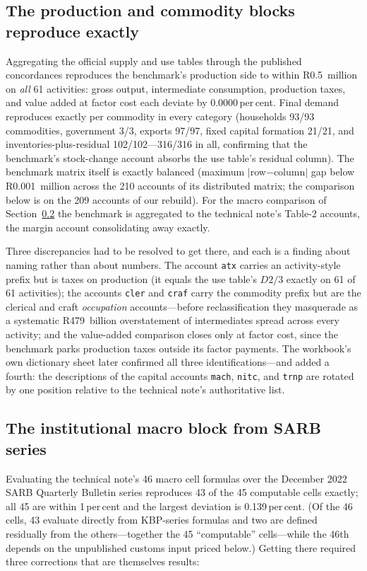 \subsection{The production and commodity blocks reproduce exactly}
\label{sec:results:production}

Aggregating the official supply and use tables through the published
concordances reproduces the benchmark's production side to within
R0.5~million on \emph{all} 61 activities: gross output, intermediate
consumption, production taxes, and value added at factor cost each deviate
by 0.0000\,per\,cent. Final demand reproduces exactly per commodity in
every category (households 93/93 commodities, government 3/3,
exports 97/97, fixed capital formation 21/21, and
inventories-plus-residual 102/102---316/316 in all,
confirming that the benchmark's stock-change account absorbs the use
table's residual column). The benchmark matrix itself is exactly balanced
(maximum $|$row$-$column$|$ gap below R0.001~million across the 210
accounts of its distributed matrix; the comparison below is on the 209
accounts of our rebuild). For the macro comparison of
Section~\ref{sec:results:macro} the benchmark is aggregated to the
technical note's Table-2 accounts, the margin account consolidating away
exactly.

Three discrepancies had to be resolved to get there, and each is a finding
about naming rather than about numbers. The account \texttt{atx} carries an
activity-style prefix but is taxes on production (it equals the use table's
$D2/3$ exactly on 61 of 61 activities); the accounts \texttt{cler} and
\texttt{craf} carry the commodity prefix but are the clerical and craft
\emph{occupation} accounts---before reclassification they masquerade as a
systematic R479~billion overstatement of intermediates spread across every
activity; and the value-added comparison closes only at factor cost, since
the benchmark parks production taxes outside its factor payments. The
workbook's own dictionary sheet later confirmed all three
identifications---and added a fourth: the descriptions of the capital
accounts \texttt{mach}, \texttt{nitc}, and \texttt{trnp} are rotated by one
position relative to the technical note's authoritative list.

\subsection{The institutional macro block from SARB series}
\label{sec:results:macro}

Evaluating the technical note's 46 macro cell formulas over the December
2022 SARB Quarterly Bulletin series reproduces 43 of the 45 computable
cells exactly; all 45 are within 1\,per\,cent and the largest deviation is
0.139\,per\,cent. (Of the 46 cells, 43 evaluate directly from KBP-series
formulas and two are defined residually from the others---together the 45
``computable'' cells---while the 46th depends on the unpublished customs
input priced below.) Getting there required three corrections that are
themselves results:

